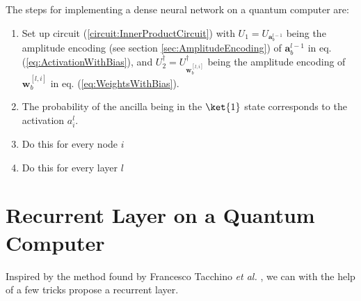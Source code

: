 The steps for implementing a dense neural network on a quantum computer are:
\begin{enumerate}[Step 1:]
\item Set up circuit (\ref{circuit:InnerProductCircuit}) with $U_1 = U_{\boldsymbol{a}^{l-1}_b}$ being the amplitude encoding (see section \ref{sec:AmplitudeEncoding}) of $\boldsymbol{a}_b^{l-1}$ in eq. (\ref{eq:ActivationWithBias}), and $U^\dagger_2 = U^\dagger_{\boldsymbol{w}^{[l,i]}_b}$ being the amplitude encoding of $\boldsymbol{w}^{[l,i]}_b$ in eq. (\ref{eq:WeightsWithBias}).
\item The probability of the ancilla being in the $\ket{1}$ state corresponds to the activation $a^l_i$.
\item Do this for every node $i$
\item Do this for every layer $l$
\end{enumerate}


\section{Recurrent Layer on a Quantum Computer}
\label{sec:RNNQuantum}
Inspired by the method found by Francesco Tacchino \textit{et al.} \cite{InnerProductArtificialNeuron}, we can with the help of a few tricks propose a recurrent layer.

